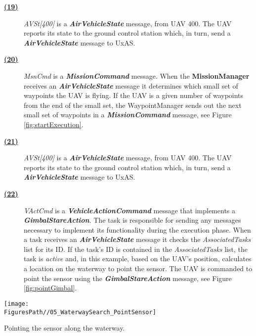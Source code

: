 \begin{description}
	\item[\hyperlink{msg:19.AirVehicleState.400}{\textbf{(19)}}]  \textit{AVSt[400]} is a \textbf{\textit{AirVehicleState}} message, from UAV 400. The UAV reports its state to the ground control station which, in turn, send a \textbf{\textit{AirVehicleState}} message to UxAS. 
	\item[\hyperlink{msg:20.MissionCommand.400}{\textbf{(20)}}]  \textit{MsnCmd} is a \textbf{\textit{MissionCommand}} message. When the \textbf{MissionManager} receives an \textbf{\textit{AirVehicleState}} message it determines which small set of waypoints the UAV is flying. If the UAV is a given number of waypoints from the end of the small set, the WaypointManager sends out the next small set of waypoints in a \textbf{\textit{MissionCommand}} message, see Figure \ref{fig:startExecution}.
	\item[\hyperlink{msg:21.AirVehicleState.400}{\textbf{(21)}}]  \textit{AVSt[400]} is a \textbf{\textit{AirVehicleState}} message, from UAV 400. The UAV reports its state to the ground control station which, in turn, send a \textbf{\textit{AirVehicleState}} message to UxAS. 
	\item[\hyperlink{msg:22.VehicleActionCommand.400}{\textbf{(22)}}]  \textit{VActCmd} is a \textbf{\textit{VehicleActionCommand}} message that implements a \textbf{\textit{GimbalStareAction}}. The task is responsible for sending any messages necessary to implement its functionality during the execution phase. When a task receives an \textbf{\textit{AirVehicleState}} message it checks the \textit{AssociatedTasks} list for its ID. If the task's ID is contained in the \textit{AssociatedTasks} list, the task is \textit{active} and, in this example, based on the UAV's position, calculates a location on the waterway to point the sensor. The UAV is commanded to point the sensor using the  \textbf{\textit{GimbalStareAction}} message, see Figure \ref{fig:pointGimbal}.  
\end{description}

\begin{marginfigure}
	\texttt{[image: \\FiguresPath//05\_WaterwaySearch\_PointSensor]}
	\caption{Pointing the sensor along the waterway.}
	\label{fig:pointGimbal}
\end{marginfigure}
